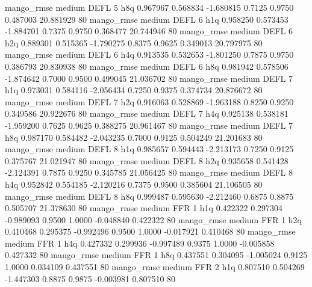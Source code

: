        mango_rmse     medium     DEFL                 5                  h8q  0.967967 0.568834 -1.680815 0.7125 0.9750  0.487003   20.881929 80
       mango_rmse     medium     DEFL                 6                  h1q  0.958250 0.573453 -1.884701 0.7375 0.9750  0.368477   20.744946 80
       mango_rmse     medium     DEFL                 6                  h2q  0.889301 0.515365 -1.790275 0.8375 0.9625  0.349013   20.797975 80
       mango_rmse     medium     DEFL                 6                  h4q  0.913535 0.532653 -1.801250 0.7875 0.9750  0.386793   20.830938 80
       mango_rmse     medium     DEFL                 6                  h8q  0.981942 0.578506 -1.874642 0.7000 0.9500  0.499045   21.036702 80
       mango_rmse     medium     DEFL                 7                  h1q  0.973031 0.584116 -2.056434 0.7250 0.9375  0.374734   20.876672 80
       mango_rmse     medium     DEFL                 7                  h2q  0.916063 0.528869 -1.963188 0.8250 0.9250  0.349586   20.922676 80
       mango_rmse     medium     DEFL                 7                  h4q  0.925138 0.538181 -1.959200 0.7625 0.9625  0.388275   20.961467 80
       mango_rmse     medium     DEFL                 7                  h8q  0.987170 0.584482 -2.043235 0.7000 0.9125  0.504249   21.201683 80
       mango_rmse     medium     DEFL                 8                  h1q  0.985657 0.594443 -2.213173 0.7250 0.9125  0.375767   21.021947 80
       mango_rmse     medium     DEFL                 8                  h2q  0.935658 0.541428 -2.124391 0.7875 0.9250  0.345785   21.056425 80
       mango_rmse     medium     DEFL                 8                  h4q  0.952842 0.554185 -2.120216 0.7375 0.9500  0.385604   21.106505 80
       mango_rmse     medium     DEFL                 8                  h8q  0.999487 0.595630 -2.212460 0.6875 0.8875  0.505707   21.378630 80
       mango_rmse     medium      FFR                 1                  h1q  0.422322 0.297304 -0.989093 0.9500 1.0000 -0.048840    0.422322 80
       mango_rmse     medium      FFR                 1                  h2q  0.410468 0.295375 -0.992496 0.9500 1.0000 -0.017921    0.410468 80
       mango_rmse     medium      FFR                 1                  h4q  0.427332 0.299936 -0.997489 0.9375 1.0000 -0.005858    0.427332 80
       mango_rmse     medium      FFR                 1                  h8q  0.437551 0.304095 -1.005024 0.9125 1.0000  0.034109    0.437551 80
       mango_rmse     medium      FFR                 2                  h1q  0.807510 0.504269 -1.447303 0.8875 0.9875 -0.003981    0.807510 80

